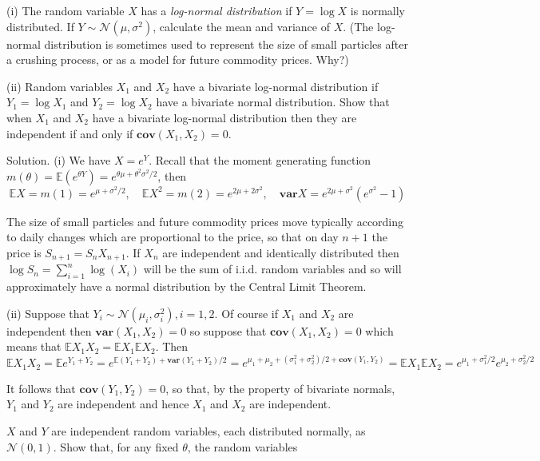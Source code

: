 \item (i) The random variable $X$ has a \emph{log-normal distribution} if $Y=\log X$ is normally distributed. If $Y\sim\mathcal{N}(\mu,\sigma^2)$, calculate the mean and variance of $X$. (The log-normal distribution is sometimes used to represent the size of small particles after a crushing process, or as a model for future commodity prices. Why?)

(ii) Random variables $X_1$ and $X_2$ have a bivariate log-normal distribution if $Y_1=\log X_1$ and $Y_2=\log X_2$ have a bivariate normal distribution. Show that when $X_1$ and $X_2$ have a bivariate log-normal distribution then they are independent if and only if $\mathbf{cov}(X_1,X_2)=0$.



Solution. (i) We have $X=e^Y$. Recall that the moment generating function $m(\theta)=\mathbb{E}(e^{\theta Y})=e^{\theta\mu+\theta^2\sigma^2/2}$, then
\begin{equation}
\mathbb{E}X = m(1) = e^{\mu + \sigma^2/2},\quad \mathbb{E}X^2 = m(2) = e^{2\mu + 2\sigma^2}, \quad \mathbf{var}X = e^{2\mu + \sigma^2}\left(e^{\sigma^2}-1\right)
\end{equation}

The size of small particles and future commodity prices move typically according to daily changes which are proportional to the price, so that on day $n+1$ the price is $S_{n+1}=S_nX_{n+1}$. If $X_n$ are independent and identically distributed then $\log S_n=\sum^n_{i=1}\log (X_i)$ will be the sum of i.i.d. random variables and so will approximately have a normal distribution by the Central Limit Theorem.

(ii) Suppose that $Y_i\sim\mathcal{N}(\mu_i,\sigma_i^2),i=1,2$. Of course if $X_1$ and $X_2$ are independent then $\mathbf{var}(X_1,X_2)=0$ so suppose that $\mathbf{cov}(X_1,X_2)=0$ which means that $\mathbb{E}X_1X_2=\mathbb{E}X_1\mathbb{E}X_2$. Then
\begin{equation}
\mathbb{E}X_1X_2 = \mathbb{E}e^{Y_1+Y_2} = e^{\mathbb{E}(Y_1+Y_2) + \mathbf{var}(Y_1+Y_2)/2} = e^{\mu_1+\mu_2 +(\sigma_1^2 +\sigma_2^2)/2+\mathbf{cov}(Y_1,Y_2)} = \mathbb{E}X_1\mathbb{E}X_2 = e^{\mu_1+\sigma_1^2/2}e^{\mu_2 +\sigma_2^2/2}
\end{equation}

It follows that $\mathbf{cov}(Y_1,Y_2)=0$, so that, by the property of bivariate normals, $Y_1$ and $Y_2$ are independent and hence $X_1$ and $X_2$ are independent.


\item $X$ and $Y$ are independent random variables, each distributed normally, as $\mathcal{N}(0,1)$. Show that, for any fixed $\theta$, the random variables

